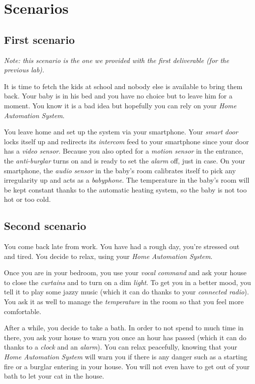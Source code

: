 	\section{Scenarios}
		\subsection{First scenario}
			\textit{Note: this scenario is the one we provided with the first deliverable (for the previous lab).}
			
			It is time to fetch the kids at school and nobody else is available to bring them back. Your baby is in his bed and you have no choice but to leave him for a moment. You know it is a bad idea but hopefully you can rely on your \emph{Home Automation System}.

      		You leave home and set up the system via your smartphone.
      		Your \emph{smart door} locks itself up and redirects its \emph{intercom} feed to your smartphone since your door has a \emph{video sensor}. Because you also opted for a \emph{motion sensor} in the entrance, the \emph{anti-burglar} turns on and is ready to set the \emph{alarm} off, just in case.
      		On your smartphone, the \emph{audio sensor} in the baby's room calibrates itself to pick any irregularity up and acts as a \emph{babyphone}. The temperature in the baby's room will be kept constant thanks to the automatic heating system, so the baby is not too hot or too cold.
		
		\subsection{Second scenario}
			You come back late from work. You have had a rough day, you're stressed out and tired. You decide to relax, using your \emph{Home Automation System}.
			
			Once you are in your bedroom, you use your \emph{vocal command} and ask your house to close the \emph{curtains} and to turn on a dim \emph{light}. To get you in a better mood, you tell it to play some jazzy music (which it can do thanks to your \emph{connected radio}). You ask it as well to manage the \emph{temperature} in the room so that you feel more comfortable.
			
			After a while, you decide to take a bath. In order to not spend to much time in there, you ask your house to warn you once an hour has passed (which it can do thanks to a \emph{clock} and an \emph{alarm}).
			You can relax peacefully, knowing that your \emph{Home Automation System} will warn you if there is any danger such as a starting fire or a burglar entering in your house. You will not even have to get out of your bath to let your cat in the house.
			
